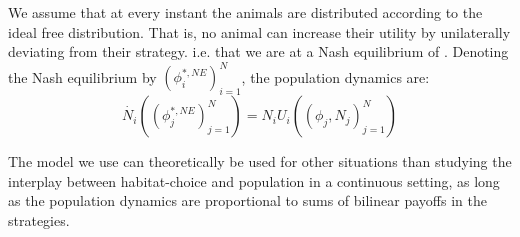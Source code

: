 We assume that at every instant the animals are distributed according to the ideal free distribution. That is, no animal can increase their utility by unilaterally deviating from their strategy. i.e. that we are at a Nash equilibrium of . Denoting the Nash equilibrium by $(\phi_i^{*,NE})^N_{i=1}$, the population dynamics are:
\begin{equation}
  \dot{N_i}((\phi_j^{*,NE})_{j=1}^N ) = N_i U_i((\phi_j, N_j)_{j=1}^N)
\end{equation}

The model we use can theoretically be used for other situations than studying the interplay between habitat-choice and population in a continuous setting, as long as the population dynamics are proportional to sums of bilinear payoffs in the strategies.
%











